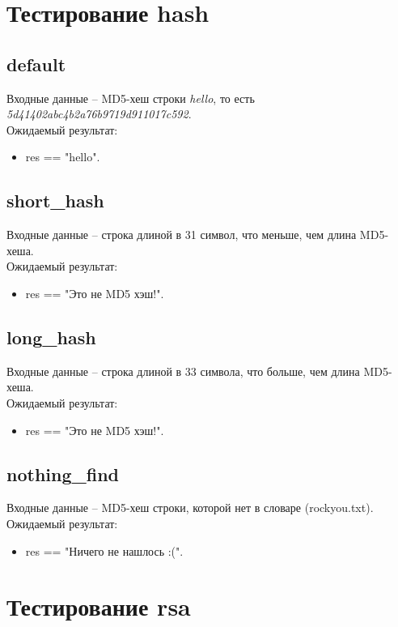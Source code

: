 \documentclass{article}
\begin{document}
\section{Тестирование hash}
\subsection{default}
Входные данные -- MD5-хеш строки \textit{hello}, то есть \textit{5d41402abc4b2a76b9719d911017c592}.\\
Ожидаемый результат: 
\begin{itemize}
    \item res == "hello". 
\end{itemize}

\subsection{short\_hash}
Входные данные -- строка длиной в 31 символ, что меньше, чем длина MD5-хеша.\\
Ожидаемый результат: 
\begin{itemize}
    \item res == "Это не MD5 хэш!". 
\end{itemize}

\subsection{long\_hash}
Входные данные -- строка длиной в 33 символа, что больше, чем длина MD5-хеша.\\
Ожидаемый результат: 
\begin{itemize}
    \item res == "Это не MD5 хэш!". 
\end{itemize}

\subsection{nothing\_find}
Входные данные -- MD5-хеш строки, которой нет в словаре (rockyou.txt).\\
Ожидаемый результат: 
\begin{itemize}
    \item res == "Ничего не нашлось :(". 
\end{itemize}

\section{Тестирование rsa}
\end{document}
